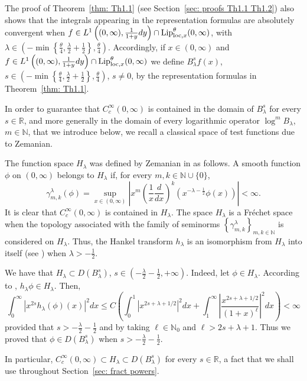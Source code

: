 \documentclass[a4paper,10pt, reqno]{amsart}
\theoremstyle{definition}
\theoremstyle{remark}
\numberwithin{equation}{section}
\begin{document}
The proof of Theorem~\ref{thm: Th1.1} (see Section~\ref{sec: proofs Th1.1 Th1.2}) also shows that the integrals appearing in the representation formulas are absolutely convergent when $f\in L^1\left((0,\infty),\frac{1}{1+y}dy\right)\cap {\textup{Lip}}^\theta _{{\rm loc},x}(0,\infty)$, with $\lambda\in (-\min\left\{\tfrac{\theta}{4},\frac{\lambda}{2}+\frac{1}{2}\right\},\tfrac{\theta}{4})$. Accordingly, if $x\in (0,\infty)$ and $f\in L^1\left((0,\infty),\frac{1}{1+y}dy\right)\cap {\textup{Lip}}^\theta _{{\rm loc}, x}(0,\infty)$ we define $B_\lambda^sf(x)$, $s\in (-\min\left\{\tfrac{\theta}{4},\frac{\lambda}{2}+\frac{1}{2 }\right\},\tfrac{\theta}{4})$, $s\neq 0$, by the representation formulas in Theorem~\ref{thm: Th1.1}.

In order to guarantee that $C_c^\infty(0,\infty)$ is contained in the domain of $B_\lambda^s$ for every $s\in\mathbb R$, and more generally in the domain of every logarithmic operator $\log^mB_\lambda$, $m\in\mathbb N$, that we introduce below, we recall a classical space of test functions due to Zemanian.

The function space $H_\lambda$ was defined by Zemanian in \cite{Ze} as follows. A smooth function $\phi$ on $(0,\infty)$ belongs to $H_\lambda$ if, for every $m,k \in \mathbb{N}\cup\{0\}$, 
\[
\gamma^\lambda_{m,k} (\phi) = \sup_{x\in (0,\infty)} \left| x^m\left(\frac{1}{x}\frac{d}{dx}\right)^k\left(x^{-\lambda - \tfrac12}\phi(x)\right)\right| < \infty.
\] 
It is clear that $C_c^\infty(0,\infty)$ is contained in $H_\lambda$.
The space $H_\lambda$ is a Fréchet space when the topology associated with the family of seminorms $\left\{\gamma^\lambda_{m,k}\right\}_{m,k\in \mathbb N}$ is considered on $H_\lambda$. Thus, the Hankel transform $h_\lambda$ is an isomorphism from $H_\lambda$ into itself (see \cite[Lemma 8]{Ze}) when $\lambda>-\tfrac12$.

We have that $H_\lambda \subset D(B_\lambda^s)$, $s \in \left(-\frac{\lambda}{2}-\frac{1}{2},+\infty\right)$. Indeed, let $\phi \in H_\lambda$. According to \cite[Lemma 8]{Ze}, $h_\lambda\phi\in H_\lambda$. Then,
\[
\int_0^\infty \left|x^{2s}h_\lambda(\phi)(x)\right|^2 dx \leq C\left(\int_0^1\left|x^{2s+\lambda+1/2}\right|^2dx + \int_1^\infty\left|\frac{x^{2s+\lambda+1/2}}{(1+x)^\ell}\right|^2dx\right) < \infty
\]
provided that $s> -\frac{\lambda}{2}-\frac{1}{2}$ and by taking $\ell \in \mathbb N_0$ and $\ell > 2s+\lambda+1$. Thus we proved that $\phi \in D(B_\lambda^s)$ when $s >-\frac{\lambda}{2}-\frac{1}{2}$.

In particular, $C_c^\infty(0,\infty)\subset H_\lambda\subset D(B_\lambda^s)$ for every $s\in\mathbb R$, a fact that we shall use throughout Section~\ref{sec: fract powers}.
\end{document}
